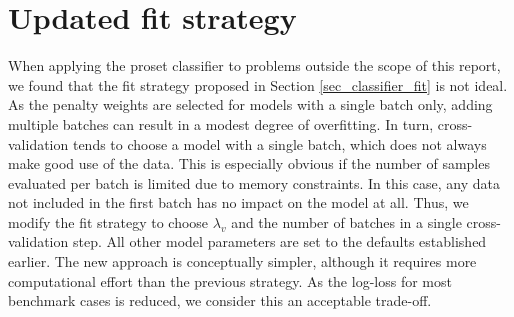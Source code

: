 \section{Updated fit strategy}
\label{sec_updated_fit}
%
\begin{center}\end{center}
%
When applying the proset classifier to problems outside the scope of this report, we found that the fit strategy proposed in Section \ref{sec_classifier_fit} is not ideal.
As the penalty weights are selected for models with a single batch only, adding multiple batches can result in a modest degree of overfitting.
In turn, cross-validation tends to choose a model with a single batch, which does not always make good use of the data.
This is especially obvious if the number of samples evaluated per batch is limited due to memory constraints.
In this case, any data not included in the first batch has no impact on the model at all.
Thus, we modify the fit strategy to choose $\lambda_v$ and the number of batches in a single cross-validation step.
All other model parameters are set to the defaults established earlier.
The new approach is conceptually simpler, although it requires more computational effort than the previous strategy.
As the log-loss for most benchmark cases is reduced, we consider this an acceptable trade-off.\par
%
